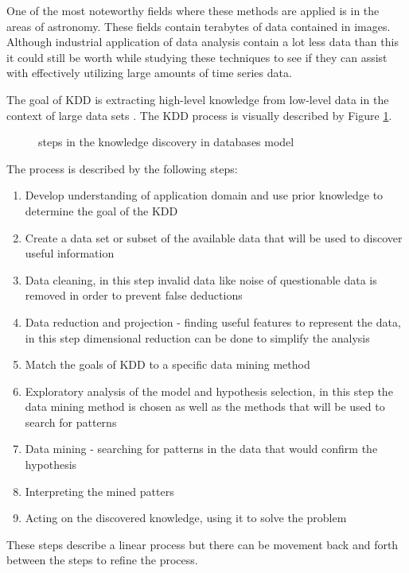 One of the most noteworthy fields where these methods are applied is in the areas of astronomy. These fields contain terabytes of data contained in images. Although industrial application of data analysis contain a lot less data than this it could still be worth while studying these techniques to see if they can assist with effectively utilizing large amounts of time series data.

The goal of KDD is extracting high-level knowledge from low-level data in the context of large data sets \cite{fayyad1996data}. The KDD process is visually described by Figure \ref{fig:6}.
\begin{figure}[!ht]
	\centering{}
	\caption{\cite{fayyad1996data} steps in the knowledge discovery in databases model}\label{fig:6}
\end{figure}
The process is described by the following steps:
\begin{enumerate}
	\item Develop understanding of application domain and use prior knowledge to determine the goal of the KDD
	\item Create a data set or subset of the available data that will be used to discover useful information
	\item Data cleaning, in this step invalid data like noise of questionable data is removed in order to prevent false deductions
	\item Data reduction and projection - finding useful features to represent the data, in this step dimensional reduction can be done to simplify the analysis
	\item Match the goals of KDD to a specific data mining method
	\item Exploratory analysis of the model and hypothesis selection, in this step the data mining method is chosen as  well as the methods that will be used to search for patterns
	\item Data mining - searching for patterns in the data that would confirm the hypothesis
	\item Interpreting the mined patters
	\item Acting on the discovered knowledge, using it to solve the problem
\end{enumerate}
These steps describe a linear process but there can be movement back and forth between the steps to refine the process.


